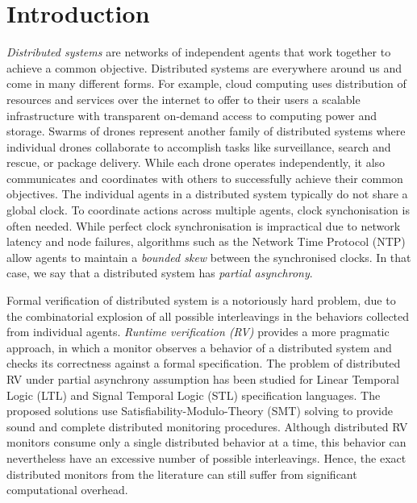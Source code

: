 \section{Introduction} \label{sec:introduction}

\emph{Distributed systems} are networks of independent agents that work together to achieve a common objective. Distributed systems are everywhere around us and come in many different forms. For example, cloud computing uses distribution of resources and services over the internet to offer to their users a scalable infrastructure with transparent on-demand access to computing power and storage. Swarms of drones represent another family of distributed systems where individual drones collaborate  to accomplish tasks like surveillance, search and rescue, or package delivery. While each drone operates independently,  it also communicates and coordinates with others to successfully achieve their common objectives. The individual agents in a distributed system typically do not share a global clock. To coordinate actions across multiple agents, clock synchonisation is often needed. While perfect clock synchronisation is impractical due to network latency and node failures, algorithms such as the Network Time Protocol (NTP) allow agents to maintain a \emph{bounded skew} between the synchronised clocks. In that case, we say that a distributed system has \emph{partial asynchrony}. 

Formal verification of distributed system is a notoriously hard problem, due to the combinatorial explosion of all possible interleavings in the behaviors collected from individual agents. \emph{Runtime verification (RV)} provides a more pragmatic approach, in which a monitor observes a behavior of a distributed system and checks its correctness against a formal specification. The problem of distributed RV under partial asynchrony assumption has been studied for Linear Temporal Logic (LTL) and Signal Temporal Logic (STL) specification languages. The proposed solutions use Satisfiability-Modulo-Theory (SMT) solving to provide sound and complete distributed monitoring procedures. Although distributed RV monitors consume only a single distributed behavior at a time, this behavior can nevertheless have an excessive number of possible interleavings. Hence, the exact distributed monitors from the literature can still suffer from significant computational overhead. 


